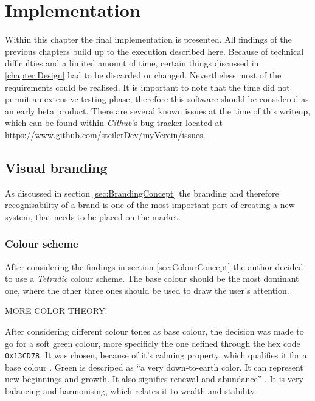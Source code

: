 \chapter{Implementation}
\label{chapter:Implementation}
Within this chapter the final implementation is presented. All findings of the previous chapters build up to the execution described here. Because of technical difficulties and a limited amount of time, certain things discussed in \vref{chapter:Design} had to be discarded or changed. Nevertheless most of the requirements could be realised. It is important to note that the time did not permit an extensive testing phase, therefore this software should be considered as an early beta product. There are several known issues at the time of this writeup, which can be found within \emph{Github}'s bug-tracker located at \url{https://www.github.com/steilerDev/myVerein/issues}.

\section{Visual branding}
\label{sec:BrandingImplementation}
As discussed in section \vref{sec:BrandingConcept} the branding and therefore recognisability of a brand is one of the most important part of creating a new system, that needs to be placed on the market. 

\subsection{Colour scheme}
After considering the findings in section \vref{sec:ColourConcept} the author decided to use a \emph{Tetradic} colour scheme. The base colour should be the most dominant one, where the other three ones should be used to draw the user's attention. 


MORE COLOR THEORY!

After considering different colour tones as base colour, the decision was made to go for a soft green colour, more specificly the one defined through the hex code \texttt{0x13CD78}. It was chosen, because of it's calming property, which qualifies it for a base colour \cite{Chapman:2010aa}. Green is descriped as \enquote{a very down-to-earth color. It can represent new beginnings and growth. It also signifies renewal and abundance} \cite{Chapman:2010aa}. It is very balancing and harmonising, which relates it to wealth and stability. 


